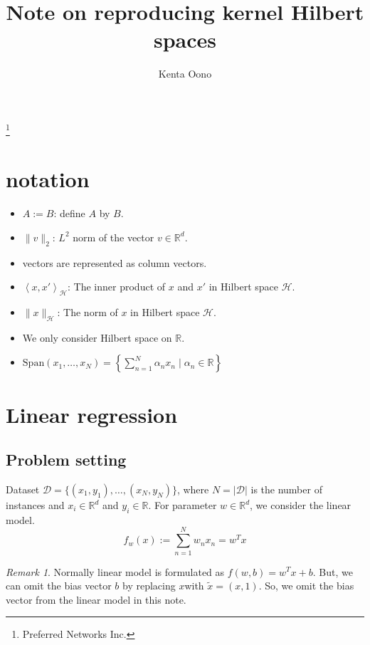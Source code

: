\documentclass{amsart}
\theoremstyle{definition}
\theoremstyle{remark}
\newtheorem{remark}[theorem]{Remark}
\numberwithin{equation}{section}
\begin{document}
\title{Note on reproducing kernel Hilbert spaces}

\author{Kenta Oono}
\thanks{Preferred Networks Inc.}

\maketitle

\section{notation}

\begin{itemize}
\item $A:=B$: define $A$ by $B$.
\item $\|v\|_2$: $L^2$ norm of the vector $v\in \mathbb{R}^d$.
\item vectors are represented as column vectors.
\item $\left< x, x'\right>_\mathcal{H}$: The inner product of $x$ and $x'$ in Hilbert space $\mathcal{H}$.
\item $\|x\|_\mathcal{H}$: The norm of $x$ in Hilbert space $\mathcal{H}$.
\item We only consider Hilbert space on $\mathbb{R}$.
\item $\mathrm{Span}(x_1, \ldots, x_N)= \left\{ \sum_{n=1}^{N} \alpha_n x_n \mid \alpha_n \in \mathbb{R} \right\}$
\end{itemize}

\section{Linear regression}\label{linear_regression}

\subsection{Problem setting}

Dataset $\mathcal{D} = \{ (x_1, y_1), \ldots, (x_N, y_N) \}$,
where $N = |\mathcal{D}|$ is the number of instances and
$x_i \in \mathbb{R}^d$ and $y_i \in \mathbb{R}$.
For parameter $w\in \mathbb{R}^d$, we consider the linear model.
\begin{equation}
f_w(x) := \sum_{n=1}^{N} w_n x_n = w^{T}x
\end{equation}

\begin{remark}
Normally linear model is formulated as $f(w, b) = w^{T}x + b$.
But, we can omit the bias vector $b$ by replacing $x$with $\tilde{x} = (x, 1)$.
So, we omit the bias vector from the linear model in this note.
\end{remark}
\end{document}

